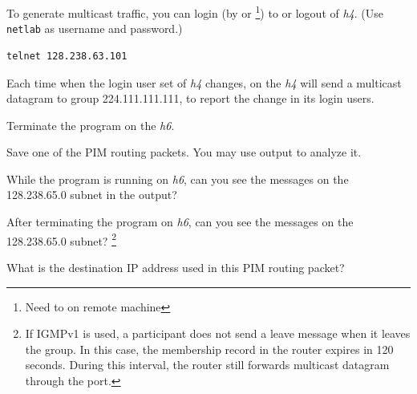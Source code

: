 \documentclass{../UTNetLab}
\begin{document}
To generate multicast traffic, you can login (by  or \footnote{Need to  on remote machine}) to or logout of \textit{h4}.
(Use \texttt{netlab} as username and password.)

\begin{lstlisting}
telnet 128.238.63.101
\end{lstlisting}

Each time when the login user set of \textit{h4} changes,  on the \textit{h4} will send a multicast datagram to group 224.111.111.111, to report the change in its login users.


Terminate the  program on the \textit{h6}.


Save one of the PIM routing packets.
You may use  output to analyze it.

\begin{report}
    \item While the  program is running on \textit{h6},
    can you see the  messages on the 128.238.65.0 subnet in the  output?

    \item After terminating the  program on \textit{h6},
    can you see the  messages on the 128.238.65.0 subnet?%
    \footnote{If IGMPv1 is used, a participant does not send a leave message when it leaves the group.
        In this case, the membership record in the router expires in 120 seconds.
        During this interval, the router still forwards multicast datagram through the port.}

    \item What is the destination IP address used in this PIM routing packet?
\end{report}
\end{document}
